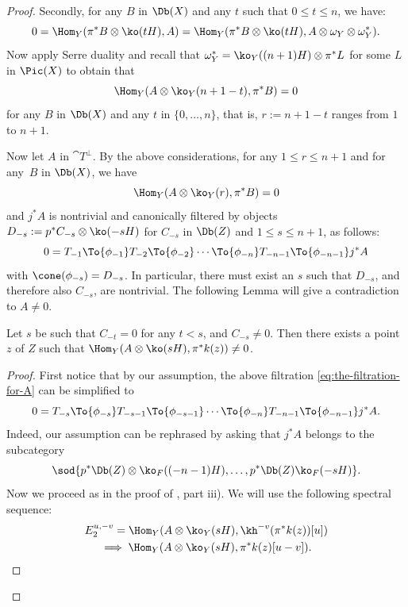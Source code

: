 \begin{proof}
Secondly, for any $B$ in $\Db(X)$ and any $t$ such that $0 \leq t \leq n$, we have:
\[
0=\Hom_Y(\pi^* B \otimes \ko(tH),A)=\Hom_Y(\pi^* B \otimes \ko(tH),A\otimes \omega_Y \otimes \omega_Y^*).
\]
Now apply Serre duality and recall that $\omega_Y^* = \ko_Y((n+1)H) \otimes \pi^* L$ for some $L$ in $\Pic(X)$ to obtain that
\[
\Hom_Y(A \otimes \ko_Y(n+1-t),\pi^* B) = 0
\]
for any $B$ in $\Db(X)$ and any $t$ in $\{0,\dots,n\}$, that is, $r:=n+1-t$ ranges from $1$ to $n+1$.

Now let $A$ in $\cat{T}^\perp$. By the above considerations, for any $1 \leq r \leq n+1$ and for any~$B$
in $\Db(X)$, we have
\begin{equation*}\label{eq:another-necessary-vanishing}
\Hom_Y(A\otimes\ko_Y(r),\pi^*B)= 0
\end{equation*}
and $j^*A$ is nontrivial and canonically filtered by objects $D_{-s}:=p^*C_{-s} \otimes \ko(-s H)$ for
$C_{-s}$ in $\Db(Z)$ and $1 \leq s \leq n+1$, as follows:
\begin{equation*}\label{eq:the-filtration-for-A}
0 = T_{-1} \To{\phi_{-1}}  T_{-2} \To{\phi_{-2}} \cdots \To{\phi_{-n}}  T_{-n-1} \To{\phi_{-n-1}}  j^*A
\end{equation*}
with $\cone(\phi_{-s}) = D_{-s}$.
In particular, there must exist an $s$ such that
$D_{-s}$, and therefore also $C_{-s}$, are nontrivial. The following Lemma will give a contradiction to $A \neq 0$.

\begin{lemma}
Let $s$ be such that $C_{-t}=0$ for any $t < s$, and $C_{-s} \neq 0$.
Then there exists a point $z$ of $Z$ such that $\Hom_Y(A \otimes \ko(sH),\pi^*k(z)) \neq 0$.
\end{lemma}

\begin{proof}
First notice that by our assumption, the above filtration \eqref{eq:the-filtration-for-A}
can be simplified to\vspace*{-3pt}
\begin{equation*}\label{eq:the-2nd-filtration-for-A}
0 = T_{-s} \To{\phi_{-s}} T_{-s-1} \To{\phi_{-s-1}} \cdots \To{\phi_{-n}} T_{-n-1} \To{\phi_{-n-1}} j^*A.
\end{equation*}
Indeed, our assumption can be rephrased by asking that $j^*A$ belongs to the subcategory\vspace*{-3pt}
\[
\sod{p^* \Db(Z) \otimes \ko_F((-n-1)H),\ldots,p^* \Db(Z) \ko_F(-sH)}.
\]
Now we proceed as in the proof of \cite[Prop.\,11.18]{Huybook}, part iii). We will use the following spectral sequence:\vspace*{-3pt}
\begin{multline*}\label{eq:the-spect-seq-in-the-lemma}
E_2^{u,-v} = \Hom_Y(A \otimes \ko_Y(sH),\kh^{-v}( \pi^* k(z))[u])\\ \implies \Hom_Y(A\otimes \ko_Y(sH), \pi^*k(z)[u-v]).
\end{multline*}


\end{proof}
\end{proof}
